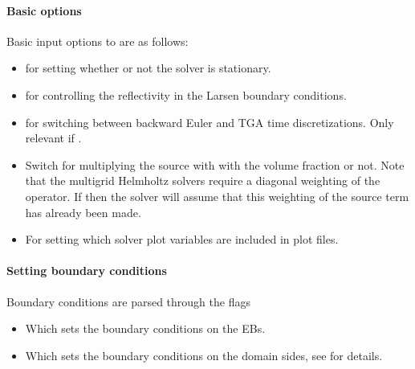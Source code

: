 \documentclass[letterpaper,10pt,english]{sphinxmanual}
\begin{document}
\paragraph{Basic options}
\label{\detokenize{Solvers/RTE:basic-options}}
Basic input options to  are as follows:
\begin{itemize}
\item {} 
 for setting whether or not the solver is stationary.

\item {} 
 for controlling the reflectivity in the Larsen boundary conditions.

\item {} 
 for switching between backward Euler and TGA time discretizations.
Only relevant if .

\item {} 
 Switch for multiplying the source with with the volume fraction or not.
Note that the multigrid Helmholtz solvers require a diagonal weighting of the operator.
If  then the solver will assume that this weighting of the source term has already been made.

\item {} 
 For setting which solver plot variables are included in plot files.

\end{itemize}


\paragraph{Setting boundary conditions}
\label{\detokenize{Solvers/RTE:setting-boundary-conditions}}
Boundary conditions are parsed through the flags
\begin{itemize}
\item {} 
 Which sets the boundary conditions on the EBs.

\item {} 
 Which sets the boundary conditions on the domain sides, see {\hyperref[\detokenize{Solvers/RTE:chap-eddingtonsp1bc}]{}} for details.

\end{itemize}
\end{document}
